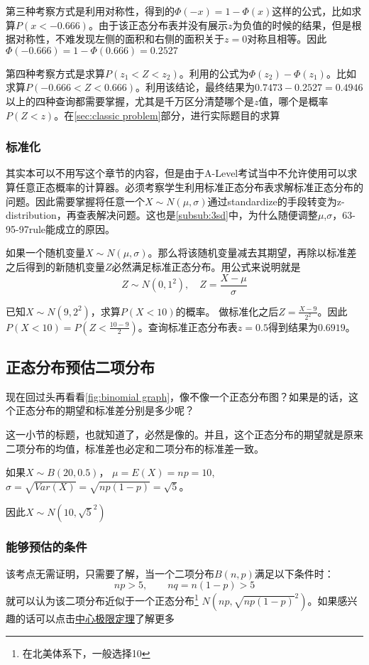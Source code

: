 第三种考察方式是利用对称性，得到的$\Phi(-x) = 1-\Phi(x)$这样的公式，比如求算$P(x<-0.666)$。由于该正态分布表并没有展示$z$为负值的时候的结果，但是根据对称性，不难发现左侧的面积和右侧的面积关于$z=0$对称且相等。因此$\Phi(-0.666)=1-\Phi(0.666)=0.2527$

第四种考察方式是求算$P(z_1<Z<z_2)$。利用的公式为$\Phi(z_2)-\Phi(z_1)$。比如求算$P(-0.666<Z<0.666)$。利用该结论，最终结果为$0.7473-0.2527=0.4946$
以上的四种查询都需要掌握，尤其是千万区分清楚哪个是$z$值，哪个是概率$P(Z<z)$。在\ref{sec:classic problem}部分，进行实际题目的求算

\subsubsection*{标准化}
其实本可以不用写这个章节的内容，但是由于A-Level考试当中不允许使用可以求算任意正态概率的计算器。必须考察学生利用标准正态分布表求解标准正态分布的问题。因此需要掌握将任意一个$X\sim N(\mu,\sigma)$通过\gls{standardize}的手段转变为z-distribution，再查表解决问题。这也是\ref{subsub:3sd}中，为什么随便调整$\mu$,$\sigma$，63-95-97rule能成立的原因。

如果一个随机变量$X\sim  N(\mu,\sigma)$。那么将该随机变量减去其期望，再除以标准差之后得到的新随机变量$Z$必然满足标准正态分布。用公式来说明就是
\[
	Z\sim N(0,1^2),\quad Z=\frac{X-\mu}{\sigma} 
\]

\begin{ExampleBox}
已知$X\sim N(9,2^2)$，求算$P(X<10)$的概率。
\tcblower
做标准化之后$Z=\frac{X-9}{2^2}$。因此$P(X<10)=P(Z<\frac{10-9}{2})$。查询标准正态分布表$z=0.5$得到结果为$0.6919$。
\end{ExampleBox}

\subsection*{正态分布预估二项分布}
现在回过头再看看\ref{fig:binomial graph}，像不像一个正态分布图？如果是的话，这个正态分布的期望和标准差分别是多少呢？

这一小节的标题，也就知道了，必然是像的。并且，这个正态分布的期望就是原来二项分布的均值，标准差也必定和二项分布的标准差一致。

\begin{ExampleBox}
如果$X\sim B(20,0.5)$， $\mu = E(X)=np=10$, $\sigma = \sqrt{Var(X)}=\sqrt{np(1-p)}=\sqrt{5}$。

因此$X\sim N(10,\sqrt{5}^2)$
\end{ExampleBox}

\subsubsection*{能够预估的条件}
该考点无需证明，只需要了解，当一个二项分布$B(n,p)$满足以下条件时：
\[
	np>5,\qquad  nq = n(1-p)>5
\]
就可以认为该二项分布近似于一个正态分布\footnote{在北美体系下，一般选择10} $N(np,\sqrt{np(1-p)}^2)$。如果感兴趣的话可以点击\href{http://bcs.whfreeman.com/webpub/Statistics/tps3e/Statistical_Applets/clt-binomial.html}{中心极限定理}了解更多

